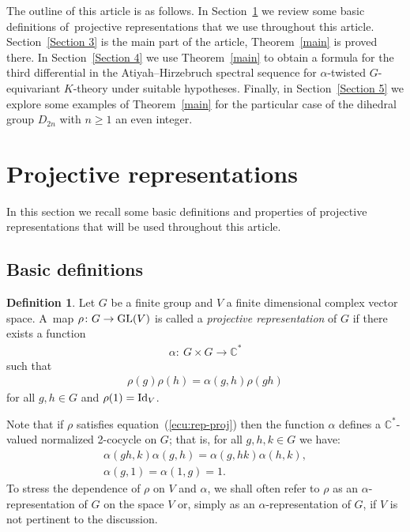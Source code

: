 \documentclass[pdftex]{sigma}
\def\C{\mathbb{C}}
\theoremstyle{definition}
\newtheorem{Def}[Th]{Definition}
\numberwithin{equation}{section}
\begin{document}
The outline of this article is as follows. In Section~\ref{Section 2} we review some basic definitions
of~pro\-jec\-tive representations that we use throughout this article. Section~\ref{Section 3} is
the main part of the article, Theorem~\ref{main} is proved there. In Section~\ref{Section 4}
we use Theorem~\ref{main} to obtain a formula for the third differential in the
Atiyah--Hirzebruch spectral sequence for $\alpha$-twisted $G$-equivariant $K$-theory
under suitable hypotheses. Finally, in Section~\ref{Section 5} we explore some examples of
Theorem~\ref{main} for the particular case of the dihedral group $D_{2n}$ with $n\ge 1$ an even integer.

\section{Projective representations}\label{Section 2}

In this section we recall some basic definitions and properties of projective representations that
will be used throughout this article.

\subsection{Basic definitions}

\begin{Def}
Let $G$ be a finite group and $V$ a finite dimensional complex
vector space. A~map $\rho\colon G\rightarrow {\rm GL}(V)$ is called a
\textit{projective representation} of $G$ if there exists a
function
\begin{gather*}
\alpha\colon \ G\times G \rightarrow \C^{\ast}
\end{gather*}
such that
\begin{gather}
\rho(g)\rho(h)=\alpha(g,h)\rho(gh)\label{ecu:rep-proj}
\end{gather}
for all $g,h\in G$ and $\rho(1)={\rm Id}_{V}$.
\end{Def}
	
Note that if $\rho$ satisfies equation~(\ref{ecu:rep-proj}) then the function $\alpha$ defines a
$\C^{\ast}$-valued normalized 2-cocycle on $G$; that is, for all $g,h,k\in G$ we have:
\begin{gather*}
\alpha(gh,k)\alpha(g,h)=\alpha(g,hk)\alpha(h,k),
\\
\alpha(g,1)=\alpha(1,g)=1.
\end{gather*}
To stress the dependence of $\rho$ on $V$ and $\alpha$, we shall
often refer to $\rho$ as an $\alpha$-representation of $G$
on the space $V$ or, simply as an $\alpha$-representation of
$G$, if $V$ is not pertinent to the discussion.
\end{document}

